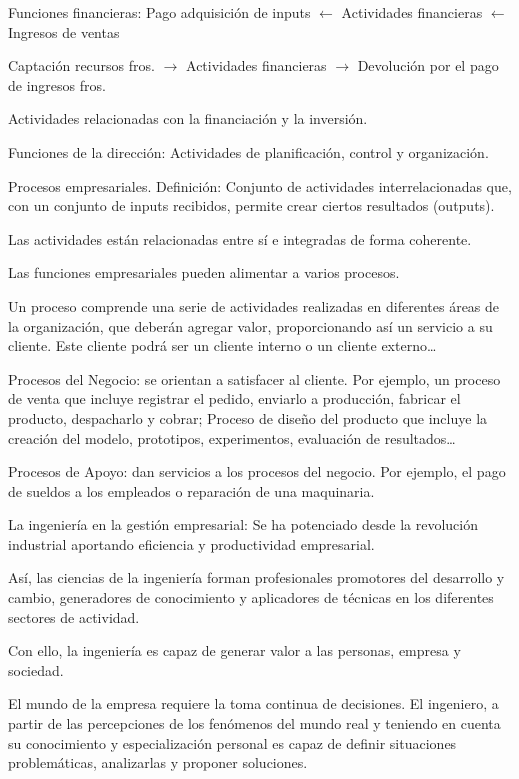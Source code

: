 \documentclass[12pt, twoside, openright]{report} %
\begin{document}
Funciones financieras: Pago adquisición de inputs $\leftarrow$ Actividades financieras $\leftarrow$ Ingresos de ventas

Captación recursos fros. $\rightarrow$ Actividades financieras $\rightarrow$ Devolución por el pago de ingresos fros.

Actividades relacionadas con la financiación y la inversión.

Funciones de la dirección: Actividades de planificación, control y organización.

Procesos empresariales. Definición: Conjunto de actividades interrelacionadas que, con un conjunto de
inputs recibidos, permite crear ciertos resultados (outputs).

Las actividades están relacionadas entre sí e integradas de forma coherente.

Las funciones empresariales pueden alimentar a varios procesos.

Un proceso comprende una serie de actividades realizadas en diferentes áreas de la organización, que
deberán agregar valor, proporcionando así un servicio a su cliente. Este cliente podrá ser un cliente interno
o un cliente externo…
\pagebreak

Procesos del Negocio: se orientan a satisfacer al cliente. Por ejemplo, un proceso de venta que incluye
registrar el pedido, enviarlo a producción, fabricar el producto, despacharlo y cobrar; Proceso de diseño del
producto que incluye la creación del modelo, prototipos, experimentos, evaluación de resultados…

Procesos de Apoyo: dan servicios a los procesos del negocio. Por ejemplo, el pago de sueldos a los empleados
o reparación de una maquinaria.

La ingeniería en la gestión empresarial: Se ha potenciado desde la revolución industrial aportando eficiencia
y productividad empresarial.

Así, las ciencias de la ingeniería forman profesionales promotores del desarrollo y cambio, generadores de
conocimiento y aplicadores de técnicas en los diferentes sectores de actividad.

Con ello, la ingeniería es capaz de generar valor a las personas, empresa y sociedad.

El mundo de la empresa requiere la toma continua de decisiones. El ingeniero, a partir de las percepciones
de los fenómenos del mundo real y teniendo en cuenta su conocimiento y especialización personal es capaz
de definir situaciones problemáticas, analizarlas y proponer soluciones.
\end{document}
